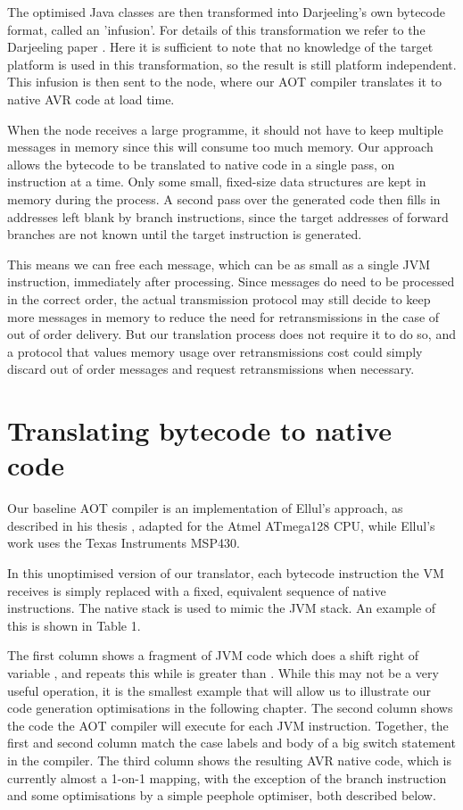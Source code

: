 The optimised Java classes are then transformed into Darjeeling's own bytecode format, called an 'infusion'. For details of this transformation we refer to the Darjeeling paper \cite{Brouwers:2009cj}. Here it is sufficient to note that no knowledge of the target platform is used in this transformation, so the result is still platform independent. This infusion is then sent to the node, where our AOT compiler translates it to native AVR code at load time.

When the node receives a large programme, it should not have to keep multiple messages in memory since this will consume too much memory. Our approach allows the bytecode to be translated to native code in a single pass, on instruction at a time. Only some small, fixed-size data structures are kept in memory during the process. A second pass over the generated code then fills in addresses left blank by branch instructions, since the target addresses of forward branches are not known until the target instruction is generated.

This means we can free each message, which can be as small as a single JVM instruction, immediately after processing. Since messages do need to be processed in the correct order, the actual transmission protocol may still decide to keep more messages in memory to reduce the need for retransmissions in the case of out of order delivery. But our translation process does not require it to do so, and a protocol that values memory usage over retransmissions cost could simply discard out of order messages and request retransmissions when necessary.


\section{Translating bytecode to native code}
\label{sec-basic-translation}
Our baseline AOT compiler is an implementation of Ellul's approach, as described in his thesis \cite{Ellul:2012thesis}, adapted for the Atmel ATmega128 CPU, while Ellul's work uses the Texas Instruments MSP430. 

In this unoptimised version of our translator, each bytecode instruction the VM receives is simply replaced with a fixed, equivalent sequence of native instructions. The native stack is used to mimic the JVM stack. An example of this is shown in Table 1.

The first column shows a fragment of JVM code which does a shift right of variable , and repeats this while  is greater than . While this may not be a very useful operation, it is the smallest example that will allow us to illustrate our code generation optimisations in the following chapter. The second column shows the code the AOT compiler will execute for each JVM instruction. Together, the first and second column match the case labels and body of a big switch statement in the compiler. The third column shows the resulting AVR native code, which is currently almost a 1-on-1 mapping, with the exception of the branch instruction and some optimisations by a simple peephole optimiser, both described below.

